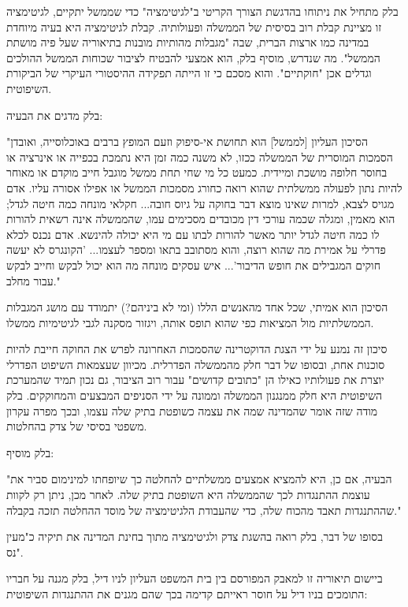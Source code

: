 \documentclass[12pt,oneside]{book}
\begin{document}
בלק מתחיל את ניתוחו בהדגשת הצורך הקריטי ב"לגיטימציה" כדי שממשל יתקיים, לגיטימציה זו מציינת קבלת רוב בסיסית של הממשלה ופעולותיה. קבלת לגיטימציה היא בעיה מיוחדת במדינה כמו ארצות הברית, שבה "מגבלות מהותיות מובנות בתיאוריה שעל פיה מושתת הממשל". מה שנדרש, מוסיף בלק, הוא אמצעי להבטיח לציבור שכוחות הממשל ההולכים וגדלים אכן "חוקתיים". והוא מסכם כי זו הייתה תפקידה ההיסטורי העיקרי של הביקורת השיפוטית.

בלק מדגים את הבעיה:

\begin{quoting}
"הסיכון העליון [לממשל] הוא תחושת אי-סיפוק וזעם המופץ ברבים באוכלוסייה, ואובדן הסמכות המוסרית של הממשלה ככזו, לא משנה כמה זמן היא נתמכת בכפייה או אינרציה או בחוסר חלופה מושכת ומיידית. כמעט כל מי שחי תחת ממשל מוגבל חייב מוקדם או מאוחר להיות נתון לפעולה ממשלתית שהוא רואה כחורג מסמכות הממשל או אפילו אסורה עליו. אדם מגויס לצבא, למרות שאינו מוצא דבר בחוקה על גיוס חובה... חקלאי מונחה כמה חיטה לגדל; הוא מאמין, ומגלה שכמה עורכי דין מכובדים מסכימים עמו, שהממשלה אינה רשאית להורות לו כמה חיטה לגדל יותר מאשר להורות לבתו עם מי היא יכולה להינשא. אדם נכנס לכלא פדרלי על אמירת מה שהוא רוצה, והוא מסתובב בתאו ומספר לעצמו... 'הקונגרס לא יעשה חוקים המגבילים את חופש הדיבור'... איש עסקים מונחה מה הוא יכול לבקש וחייב לבקש עבור מחלב."
\end{quoting}

הסיכון הוא אמיתי, שכל אחד מהאנשים הללו (ומי לא ביניהם?) יתמודד עם מושג המגבלות הממשלתיות מול המציאות כפי שהוא תופס אותה, ויגזור מסקנה לגבי לגיטימיות ממשלו.

סיכון זה נמנע על ידי הצגת הדוקטרינה שהסמכות האחרונה לפרש את החוקה חייבת להיות סוכנות אחת, ובסופו של דבר חלק מהממשלה הפדרלית. מכיוון שעצמאות השיפוט הפדרלי יוצרת את פעולותיו כאילו הן "כתובים קדושים" עבור רוב הציבור, גם נכון תמיד שהמערכת השיפוטית היא חלק ממנגנון הממשלה וממונה על ידי הסניפים המבצעים והמחוקקים. בלק מודה שזה אומר שהמדינה שמה את עצמה כשופטת בתיק שלה עצמו, ובכך מפרה עקרון משפטי בסיסי של צדק בהחלטות.

בלק מוסיף:

\begin{quoting}
"הבעיה, אם כן, היא להמציא אמצעים ממשלתיים להחלטה כך שיופחתו למינימום סביר את עוצמת ההתנגדות לכך שהממשלה היא השופטת בתיק שלה. לאחר מכן, ניתן רק לקוות שההתנגדות תאבד מהכוח שלה, כדי שהעבודת הלגיטימציה של מוסד ההחלטה תזכה בקבלה."
\end{quoting}

בסופו של דבר, בלק רואה בהשגת צדק ולגיטימציה מתוך בחינת המדינה את תיקיה כ"מעין נס".

ביישום תיאוריה זו למאבק המפורסם בין בית המשפט העליון לניו דיל, בלק מגנה על חבריו התומכים בניו דיל על חוסר ראייתם קדימה בכך שהם מגנים את ההתנגדות השיפוטית:
\end{document}
